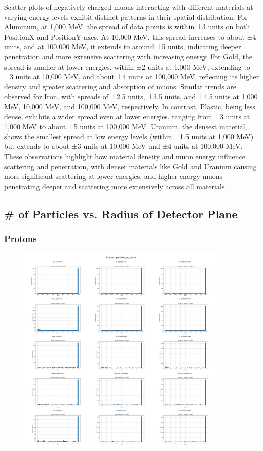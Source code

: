\documentclass{article}
\begin{document}
\noindent Scatter plots of negatively charged muons interacting with different materials at varying energy levels exhibit distinct patterns in their spatial distribution. For Aluminum, at 1,000 MeV, the spread of data points is within ±3 units on both PositionX and PositionY axes. At 10,000 MeV, this spread increases to about ±4 units, and at 100,000 MeV, it extends to around ±5 units, indicating deeper penetration and more extensive scattering with increasing energy. For Gold, the spread is smaller at lower energies, within ±2 units at 1,000 MeV, extending to ±3 units at 10,000 MeV, and about ±4 units at 100,000 MeV, reflecting its higher density and greater scattering and absorption of muons. Similar trends are observed for Iron, with spreads of ±2.5 units, ±3.5 units, and ±4.5 units at 1,000 MeV, 10,000 MeV, and 100,000 MeV, respectively. In contrast, Plastic, being less dense, exhibits a wider spread even at lower energies, ranging from ±3 units at 1,000 MeV to about ±5 units at 100,000 MeV. Uranium, the densest material, shows the smallest spread at low energy levels (within ±1.5 units at 1,000 MeV) but extends to about ±3 units at 10,000 MeV and ±4 units at 100,000 MeV. These observations highlight how material density and muon energy influence scattering and penetration, with denser materials like Gold and Uranium causing more significant scattering at lower energies, and higher energy muons penetrating deeper and scattering more extensively across all materials.

\subsection{\# of Particles vs. Radius of Detector Plane}

\subsubsection{Protons}

\begin{figure}[H]
\centering
\includegraphics[width=0.9\textwidth]{images/Combined Plots/particles_vs_radius_p.png}
\end{figure}\
\end{document}
